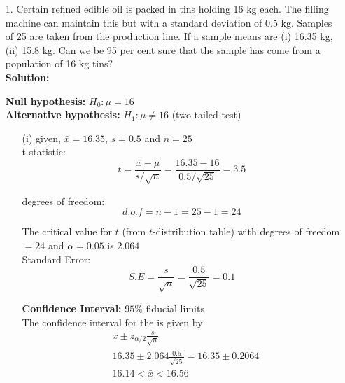 \documentclass[a4paper,11pt,openright]{report}
\begin{document}
\begin{enumerate}

\item[1.] Certain refined edible oil is packed in tins holding 16 kg each. The filling
machine can maintain this but with a standard deviation of 0.5 kg. Samples of 25 are taken
from the production line. If a sample means are (i) 16.35 kg, (ii) 15.8 kg. Can we be 95 per
cent sure that the sample has come from a population of 16 kg tins? \\

\textbf{Solution:}

\textbf{Null hypothesis:} $H_{0}: \mu = 16$ \\
\textbf{Alternative hypothesis:} $H_{1}: \mu \neq 16$ \hspace{5px} (two tailed test)

\begin{enumerate}
\item[(i)] given, $\bar x = 16.35$, $s = 0.5$ and $n = 25$ \\

t-statistic:
\begin{equation*}
t = \frac{\bar x - \mu}{s/\sqrt{n}}
  = \frac{16.35 - 16}{0.5/\sqrt{25}} 
  = 3.5
\end{equation*}

degrees of freedom:
\begin{equation*}
d.o.f = n - 1 = 25 - 1 = 24
\end{equation*}

The critical value for $t$ (from $t$-distribution table) with degrees of freedom $= 24$ and
$\alpha = 0.05$ is $2.064$ \\

Standard Error:
\begin{equation*}
S.E = \frac{s}{\sqrt{n}} = \frac{0.5}{\sqrt{25}} = 0.1
\end{equation*}

\textbf{Confidence Interval:} $95\%$ fiducial limits \\
The confidence interval for the is given by
\begin{equation*}
\begin{split}
&\bar x \pm z_{\alpha/2} \frac{s}{\sqrt{n}} \\
&16.35 \pm 2.064 \frac{0.5}{\sqrt{25}} = 16.35 \pm 0.2064 \\
&16.14 < \bar x < 16.56
\end{split}
\end{equation*}


\end{enumerate}
\end{enumerate}
\end{document}
